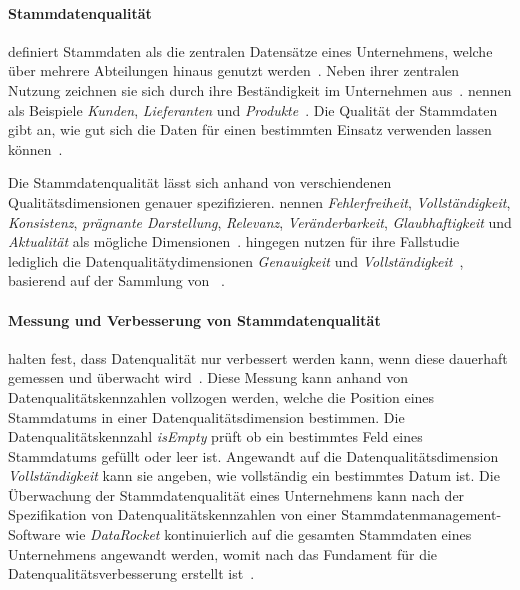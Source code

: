 \documentclass[
  language=german, %
  type=bachelor%
]{isthesis}
\begin{document}
\begin{content}
	\paragraph{Stammdatenqualität} \textsc{\citeauthor{otto2012design}} definiert
	Stammdaten als die zentralen Datensätze eines Unternehmens, welche über
	mehrere Abteilungen hinaus genutzt werden~\cite[][S. 1 f.]{otto2012design}.
	Neben ihrer zentralen Nutzung zeichnen sie sich durch ihre Beständigkeit im
	Unternehmen aus~\cite[][S.  1]{knolmayer2006quality}.
	\textsc{\citeauthor{knolmayer2006quality}} nennen als Beispiele
	\textit{Kunden}, \textit{Lieferanten} und \textit{Produkte}~\cite[][S.
	1]{knolmayer2006quality}. Die Qualität der Stammdaten gibt an, wie gut sich
	die Daten für einen bestimmten Einsatz verwenden lassen können~\cite[][S.
	8]{otto2011stammdatenmanagement}.

	Die Stammdatenqualität lässt sich anhand von verschiendenen
	Qualitätsdimensionen genauer spezifizieren.
	\textsc{\citeauthor{pipino2002data}} nennen \zB{} \textit{Fehlerfreiheit},
	\textit{Vollständigkeit}, \textit{Konsistenz}, \textit{prägnante
	Darstellung}, \textit{Relevanz}, \textit{Veränderbarkeit},
	\textit{Glaubhaftigkeit} und \textit{Aktualität} als mögliche
	Dimensionen~\cite[][S. 213 f., S. 4 f.]{pipino2002data,
	legner2007stammdaten}. \textsc{\citeauthor{baghi2013controlling}} hingegen
	nutzen für ihre Fallstudie lediglich die Datenqualitätydimensionen
	\textit{Genauigkeit} und \textit{Vollständigkeit}~\cite[][S.
	4]{baghi2013controlling}, basierend auf der Sammlung von
	\textsc{\citeauthor{wand1996anchoring}}~\cite[][S. 8 f.]{wand1996anchoring}.

	\paragraph{Messung und Verbesserung von Stammdatenqualität}
	\textsc{\citeauthor{baghi2013controlling}} halten fest, dass Datenqualität
	nur verbessert werden kann, wenn diese dauerhaft gemessen und überwacht
	wird~\cite[][S. 2]{baghi2013controlling}. Diese Messung kann anhand von
	Datenqualitätskennzahlen vollzogen werden, welche die Position eines
	Stammdatums in einer Datenqualitätsdimension bestimmen. Die
	Datenqualitätskennzahl \textit{isEmpty} prüft \zB{} ob ein bestimmtes Feld
	eines Stammdatums gefüllt oder leer ist. Angewandt auf die
	Datenqualitätsdimension \textit{Vollständigkeit} kann sie angeben, wie
	vollständig ein bestimmtes Datum ist. Die Überwachung der Stammdatenqualität
	eines Unternehmens kann nach der Spezifikation von Datenqualitätskennzahlen
	von einer Stammdatenmanagement-Software wie \zB{} \textit{DataRocket}
	kontinuierlich auf die gesamten Stammdaten eines Unternehmens angewandt
	werden, womit nach \textsc{\citeauthor{baghi2013controlling}} das Fundament
	für die Datenqualitätsverbesserung erstellt ist~\cite[][S.
	2]{baghi2013controlling}.


\end{content}
\end{document}
